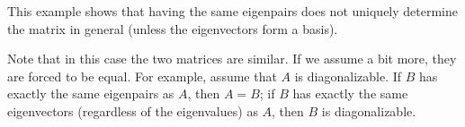 \documentclass{article}
\begin{document}

This example shows that having the same eigenpairs does not uniquely determine the matrix in general  (unless the eigenvectors  form a basis).
\medskip

Note that in this case the two matrices are similar. If we assume a bit more, they are forced to be equal. For example, assume that $A$ is  diagonalizable. If $B$ has exactly the same eigenpairs as $A$, then $A=B$; if $B$ has exactly the same eigenvectors (regardless of the eigenvalues) as $A$, then $B$ is diagonalizable.
\medskip

%
%
%
%
%
\end{document}
